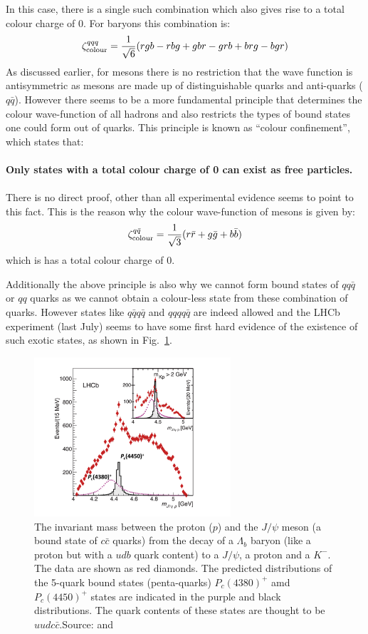 In this case, there is a single such combination which also gives rise to a total colour charge of 0. For baryons this combination is:
\[
\zeta_{\rm colour}^{qqq}=\frac{1}{\sqrt{6}}(rgb-rbg+gbr-grb+brg-bgr)
\]
As discussed earlier, for mesons  there is no restriction that the wave function is antisymmetric as mesons are made up of distinguishable quarks and anti-quarks ($q\bar{q}$). However there seems to be a more fundamental principle that determines the colour wave-function of all hadrons and also restricts the types of bound states one could form out of quarks. This principle is known as ``colour confinement'', which states that:\\\\
{\bf Only states with a total colour charge of 0 can exist as free particles.}\\\\
There is no direct proof, other than all experimental evidence seems to point to this fact. This is the reason why the colour wave-function of mesons is given by:
\[
\zeta_{\rm colour}^{q\bar{q}}=\frac{1}{\sqrt{3}}(r\bar{r}+g\bar{g}+b\bar{b})
\]
which is has a total colour charge of 0. 

Additionally the above principle is also why we cannot form bound states of $qq\bar{q}$ or $qq$ quarks as we cannot obtain a colour-less state from these combination of quarks. However states like $q\bar{q}q\bar{q}$ and $qqqq\bar{q}$ are indeed allowed and the LHCb experiment (last July) seems to have some first hard evidence of the existence of such exotic states, as shown in Fig.~\ref{fig:lhcb_pentaquark}.
\begin{figure}
\centering
\includegraphics[width=0.65\textwidth]{fig/strongforce/lhcb_pentaquark.png}
\caption{The invariant mass between the proton ($p$) and the $J/\psi$ meson (a bound state of $c\bar{c}$ quarks) from the decay of a $\Lambda_{b}$ baryon (like a proton but with a $udb$ quark content) to a $J/\psi$, a proton and a $K^-$. The data are shown as red diamonds. The predicted distributions of the 5-quark bound states (penta-quarks) $P_c(4380)^+$ amd $P_c(4450)^+$ states are indicated in the purple and black distributions. The quark contents of these states are thought to be $uudc\bar{c}$.{\tiny Source: and }}
\label{fig:lhcb_pentaquark}
\end{figure}

